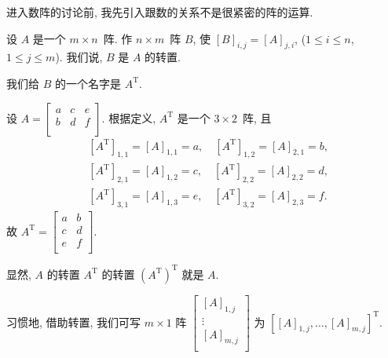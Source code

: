 \documentclass[%
    UTF8,%
    fontset=none,%
    punct=kaiming,%
    zihao=-4,%
    a4paper,%
    oneside,%
]{ctexbook}
\renewcommand*{\leq}{\leqslant}
\begin{document}
\vspace{2ex}

进入数阵的讨论前,
我先引入跟数的关系不是很紧密的阵的运算.

\begin{definition}[转置]
    设 \(A\) 是一个 \(m \times n\)~阵.
    作 \(n \times m\)~阵 \(B\),
    使 \([B]_{i,j} = [A]_{j,i}\),
    (\(1 \leq i \leq n\), \(1 \leq j \leq m\)).
    我们说, \(B\) 是 \(A\) 的转置.

    我们给 \(B\) 的一个名字是 \(A^{\mathrm{T}}\).
\end{definition}

\begin{example}
    设
    \(
    A =
    \begin{bmatrix}
        a & c & e \\
        b & d & f \\
    \end{bmatrix}.
    \)
    根据定义, \(A^{\mathrm{T}}\) 是一个 \(3 \times 2\)~阵, 且
    \begin{align*}
         & [A^{\mathrm{T}}]_{1,1} = [A]_{1,1} = a,
        \quad [A^{\mathrm{T}}]_{1,2} = [A]_{2,1} = b, \\
         & [A^{\mathrm{T}}]_{2,1} = [A]_{1,2} = c,
        \quad [A^{\mathrm{T}}]_{2,2} = [A]_{2,2} = d, \\
         & [A^{\mathrm{T}}]_{3,1} = [A]_{1,3} = e,
        \quad [A^{\mathrm{T}}]_{3,2} = [A]_{2,3} = f.
    \end{align*}
    故
    \(
    A^{\mathrm{T}}
    = \begin{bmatrix}
        a & b \\
        c & d \\
        e & f \\
    \end{bmatrix}.
    \)
\end{example}

显然, \(A\) 的转置 \(A^{\mathrm{T}}\) 的转置
\((A^{\mathrm{T}})^{\mathrm{T}}\)
就是 \(A\).

习惯地, 借助转置, 我们可写 \(m \times 1\) 阵
\(
\begin{bmatrix}
    [A]_{1,j} \\
    \vdots    \\
    [A]_{m,j} \\
\end{bmatrix}
\)
为
\(
[ [A]_{1,j}, \dots, [A]_{m,j} ]^{\mathrm{T}}.
\)

\vspace{2ex}
\end{document}
